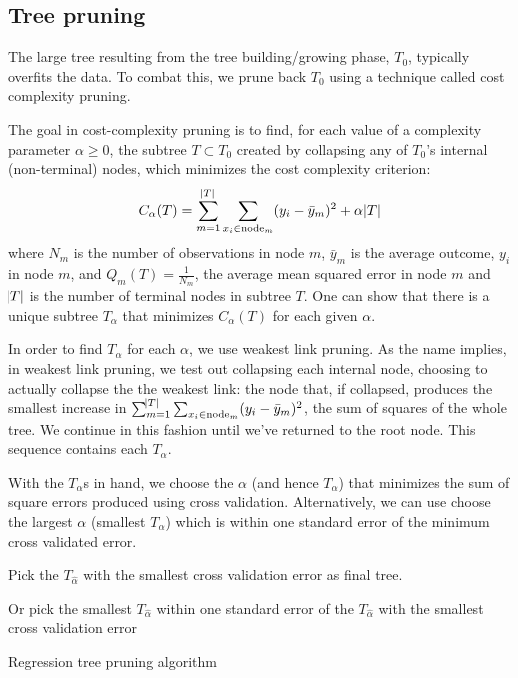 \documentclass[12pt]{article}
\begin{document}

\subsection{Tree pruning} %
\label{sub:tree_pruning}

The large tree resulting from the tree building/growing phase, $T_{0}$, typically overfits the data. To combat this, we prune back $T_{0}$ using a technique called cost complexity pruning.

The goal in cost-complexity pruning is to find, for each value of a complexity parameter $\alpha \geq 0$, the subtree $T \subset T_{0}$ created by collapsing any of $T_{0}$'s internal (non-terminal) nodes, which minimizes the cost complexity criterion:
%
\begin{equation}
    C_{\alpha}(T) = \sum_{m = 1}^{\abs{T}} \sum_{x_{i} \in \text{node}_{m}} (y_{i} - \bar{y}_{m})^2 + \alpha \abs{T}
\end{equation}
%
where $N_{m}$ is the number of observations in node $m$, $\bar{y}_{m}$ is the average outcome, $y_{i}$ in node $m$, and $Q_{m}(T) = \frac{1}{N_{m}} $, the average mean squared error in node $m$ and $\abs{T}$ is the number of terminal nodes in subtree $T$. One can show that there is a unique subtree $T_{\alpha}$ that minimizes $C_{\alpha}(T)$ for each given $\alpha$.

In order to find $T_{\alpha}$ for each $\alpha$, we use weakest link pruning. As the name implies, in weakest link pruning, we test out collapsing each internal node, choosing to actually collapse the the weakest link: the node that, if collapsed, produces the smallest increase in $\sum_{m = 1}^{\abs{T}} \sum_{x_{i} \in \text{node}_{m}} (y_{i} - \bar{y}_{m})^2$, the sum of squares of the whole tree. We continue in this fashion until we've returned to the root node. This sequence contains each $T_{\alpha}$.

With the $T_{\alpha}$s in hand, we choose the $\alpha$ (and hence $T_{\alpha}$) that minimizes the sum of square errors produced using cross validation. Alternatively, we can use choose the largest $\alpha$ (smallest $T_{\alpha}$) which is within one standard error of the minimum cross validated error.

\begin{algorithm}[ht]
Pick the $T_{\hat{\alpha}}$ with the smallest cross validation error as final tree.

Or pick the smallest $T_{\hat{\alpha}}$ within one standard error of the $T_{\hat{\alpha}}$ with the smallest cross validation error
 \caption{Regression tree pruning algorithm}
\end{algorithm}
\end{document}
